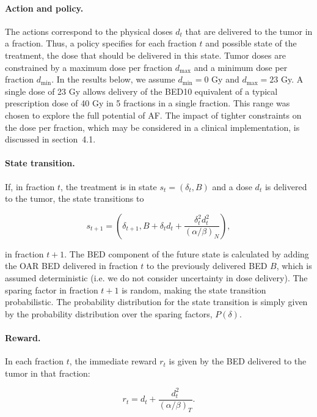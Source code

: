 \documentclass[11pt]{article}
\begin{document}
\paragraph{Action and policy.}
The actions correspond to the physical doses $d_t$ that are delivered to the tumor in a fraction. Thus, a policy specifies for each fraction $t$ and possible state of the treatment, the dose that should be delivered in this state. Tumor doses are constrained by a maximum dose per fraction $d_{\max}$ and a minimum dose per fraction $d_{\min}$. In the results below, we assume $d_{\min} = 0$ Gy and $d_{\max} = 23$ Gy. A single dose of 23 Gy allows delivery of the BED10 equivalent of a typical prescription dose of 40 Gy in 5 fractions in a single fraction. This range was chosen to explore the full potential of AF. The impact of tighter constraints on the dose per fraction, which may be considered in a clinical implementation, is discussed in section~4.1.

\paragraph{State transition.}
If, in fraction $t$, the treatment is in state $s_t = (\delta_t, B)$ and a dose $d_t$ is delivered to the tumor, the state transitions to

\begin{equation}
s_{t+1} = \left(\delta_{t+1}, B + \delta_t d_t + \frac{\delta_t^2 d_t^2}{(\alpha/\beta)_N}\right),
\label{eq:state-transition}
\end{equation}

in fraction $t+1$. The BED component of the future state is calculated by adding the OAR BED delivered in fraction $t$ to the previously delivered BED $B$, which is assumed deterministic (i.e. we do not consider uncertainty in dose delivery). The sparing factor in fraction $t+1$ is random, making the state transition probabilistic. The probability distribution for the state transition is simply given by the probability distribution over the sparing factors, $P(\delta)$.

\paragraph{Reward.}
In each fraction $t$, the immediate reward $r_t$ is given by the BED delivered to the tumor in that fraction:

\begin{equation}
r_t = d_t + \frac{d_t^2}{(\alpha/\beta)_T}.
\label{eq:reward}
\end{equation}
\end{document}
